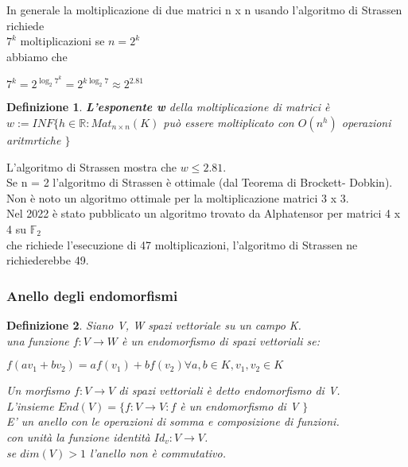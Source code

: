 \documentclass[a4paper,12pt]{article}
\theoremstyle{def}
\newtheorem*{definition}{Definizione}
\theoremstyle{prop}
\theoremstyle{esempio}
\theoremstyle{dimostrazione}
\theoremstyle{teo}
\theoremstyle{osservazione}
\begin{document}
In generale la moltiplicazione di due matrici n x n usando l'algoritmo di Strassen richiede\\
\(7^k\) moltiplicazioni se \(n = 2^k\)\\
abbiamo che
\begin{center}
	\(7^k = 2^{\log_2 7^k}=2^{k \log_2 7} \approx 2^{2.81}\)
\end{center}

\begin{definition}
	\textbf{L'esponente w} della moltiplicazione di matrici è\\
	\(w := INF\{ h \in \mathbb{R} : Mat_{n \times n}(K)\) può essere moltiplicato con \(O(n^h)\) operazioni aritmrtiche \(\}\)\\
\end{definition}

\vspace{\baselineskip}L'algoritmo di Strassen mostra che \(w \leq 2.81\).\\
Se n = 2 l'algoritmo di Strassen è ottimale (dal Teorema di Brockett- Dobkin).\\
Non è noto un algoritmo ottimale per la moltiplicazione matrici 3 x 3.\\
Nel 2022 è stato pubblicato un algoritmo trovato da Alphatensor per matrici 4 x 4 su \(\mathbb{F}_2\)\\
che richiede l'esecuzione di 47 moltiplicazioni, l'algoritmo di Strassen ne richiederebbe 49.\\

\subsubsection{Anello degli endomorfismi}
\begin{definition}
	Siano V, W spazi vettoriale su un campo K.\\
	una funzione \(f : V \rightarrow W\) è un endomorfismo di spazi vettoriali se:
	\begin{center}
		\item \(f(a v_1 + b v_2) = a f(v_1) + b f(v_2) \forall a,b \in K, v_1, v_2 \in K\)
	\end{center}
	Un morfismo \(f: V \rightarrow V\) di spazi vettoriali è detto endomorfismo di V.\\
	L'insieme \(End(V) = \{ f : V \rightarrow V : f\) è un endomorfismo di V \(\}\)\\
	E' un anello con le operazioni di somma e composizione di funzioni.\\
	con unità la funzione identità \(Id_v : V \rightarrow V\).\\
	se \(dim(V) > 1\) l'anello non è commutativo.\\
\end{definition}
\end{document}
